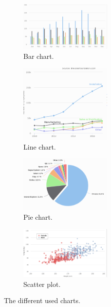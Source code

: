 \begin{figure}[h!]
  \begin{subfigure}{.50\textwidth}
      \center
      \includegraphics[width=0.50\textwidth]{images/chapter3/chartexmple/bar.PNG}
      \caption{Bar chart.}
  \end{subfigure}
  \begin{subfigure}{.50\textwidth}
      \center
      \includegraphics[width=0.50\textwidth]{images/chapter3/chartexmple/line.PNG}
      \caption{Line chart.}
  \end{subfigure}
  \begin{subfigure}{.50\textwidth}
      \center
      \includegraphics[width=0.50\textwidth]{images/chapter3/chartexmple/pie.PNG}
      \caption{Pie chart.}
  \end{subfigure}
  \begin{subfigure}{.50\textwidth}
      \center
      \includegraphics[width=0.50\textwidth]{images/chapter3/chartexmple/scatter.PNG}
      \caption{Scatter plot.}
  \end{subfigure}
  \caption{The different used charts.}
\end{figure}

